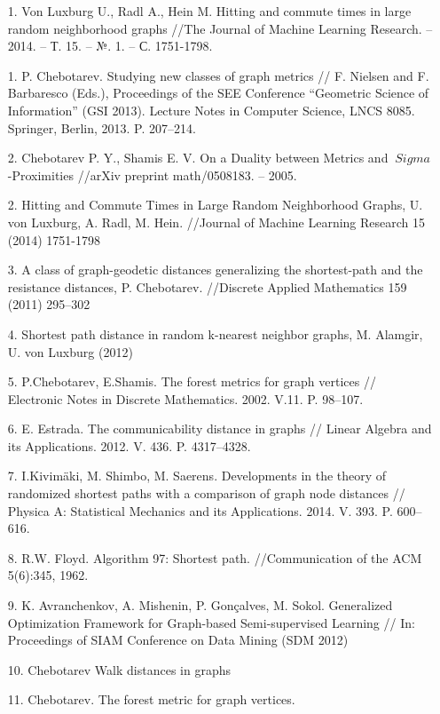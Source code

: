 \clearpage
{}				
{}	%
	

\begin{itemize}
\item[1.] Von Luxburg U., Radl A., Hein M. Hitting and commute times in large random neighborhood graphs //The Journal of Machine Learning Research. – 2014. – Т. 15. – №. 1. – С. 1751-1798.


\item[1.] P. Chebotarev. Studying new classes of graph metrics // F. Nielsen and F. Barbaresco (Eds.), Proceedings of the SEE Conference “Geometric Science of Information” (GSI 2013). Lecture Notes in Computer Science, LNCS 8085. Springer, Berlin, 2013. P. 207–214.

\item[2.] Chebotarev P. Y., Shamis E. V. On a Duality between Metrics and $\ Sigma $-Proximities //arXiv preprint math/0508183. – 2005.

\item[2.] Hitting and Commute Times in Large Random Neighborhood Graphs, U. von Luxburg, A. Radl, M. Hein.
//Journal of Machine Learning Research 15 (2014) 1751-1798

\item[3.] A class of graph-geodetic distances generalizing the shortest-path and the resistance distances, P. Chebotarev. 
//Discrete Applied Mathematics 159 (2011) 295–302

\item[4.] Shortest path distance in random k-nearest neighbor graphs, M. Alamgir, U. von Luxburg (2012)

\item[5.] P.Chebotarev, E.Shamis. The forest metrics for graph vertices // Electronic Notes in Discrete Mathematics. 2002. V.11. P. 98–107.

\item[6.] E. Estrada. The communicability distance in graphs // Linear Algebra and its Applications. 2012. V. 436. P. 4317–4328.

\item[7.] I.Kivimäki, M. Shimbo, M. Saerens. Developments in the theory of randomized shortest paths with a comparison of graph node distances // Physica A: Statistical Mechanics and its Applications. 2014. V. 393. P. 600–616.
 
\item[8.] R.W. Floyd. Algorithm 97: Shortest path. //Communication of the ACM 5(6):345, 1962.

\item[9.] K. Avranchenkov, A. Mishenin, P. Gonçalves, M. Sokol. Generalized Optimization Framework for Graph-based Semi-supervised Learning // In: Proceedings of SIAM Conference on Data Mining (SDM 2012)

\item[10.] Chebotarev Walk distances in graphs

\item[11.] Chebotarev. The forest metric for graph vertices.

\end{itemize}